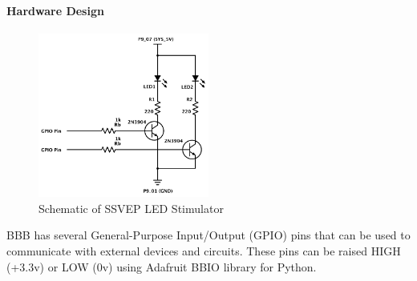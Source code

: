 \documentclass[12pt]{article}
\newcommand\mysubsubsubsection[1]{\paragraph{#1}\hspace{0pt}}
\numberwithin{equation}{section}
\numberwithin{figure}{section}
\numberwithin{table}{section}
\begin{document}
\mysubsubsubsection{Hardware Design}
\par{
    \begin{figure}[ht]
        \centering
        \includegraphics[width=0.5\textwidth]{images/led_circuit}
        \caption{Schematic of SSVEP LED Stimulator}
        \label{fig:bbb_led_schema}
    \end{figure}
    BBB has several General-Purpose Input/Output (GPIO) pins that can be used to communicate with external
    devices and circuits. These pins can be raised HIGH (+3.3v) or LOW (0v)
    using Adafruit BBIO library for Python.
}
\end{document}
